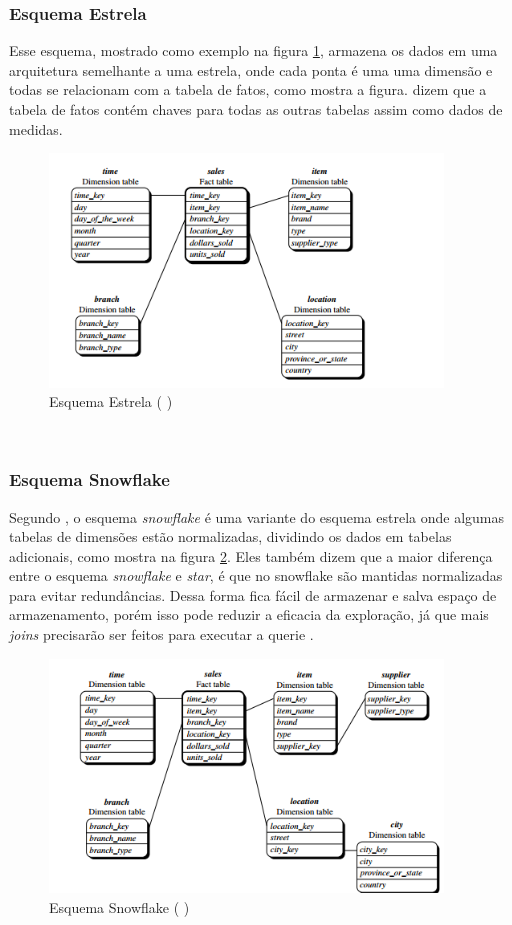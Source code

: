\subsubsection{Esquema Estrela}
Esse esquema, mostrado como exemplo na figura \ref{star}, armazena os dados em uma arquitetura semelhante a uma estrela, onde cada ponta é uma uma dimensão e todas se relacionam com a tabela de fatos, como mostra a figura.  dizem que a tabela de fatos contém chaves para todas as outras tabelas assim como dados de medidas.
\begin{figure}[ht]
\centering
\includegraphics[height=6.2cm]{imagens/starscheme.png}
\caption{Esquema Estrela (\citeauthor{jmj} \citeyear{jmj})}
\label{star}
\end{figure}
\\
\subsubsection{Esquema Snowflake}
Segundo , o esquema \textit{snowflake} é uma variante do esquema estrela onde algumas tabelas de dimensões estão normalizadas, dividindo os dados em tabelas adicionais, como mostra na figura \ref{snowflake}. Eles também dizem que a maior diferença entre o esquema \textit{snowflake} e \textit{star}, é que no snowflake são mantidas normalizadas para evitar redundâncias. Dessa forma fica fácil de armazenar e salva espaço de armazenamento, porém isso pode reduzir a eficacia da exploração, já que mais \textit{joins} precisarão ser feitos para executar a querie \citep{jmj}.
\begin{figure}[ht]
\centering
\includegraphics[height=6.2cm]{imagens/snowflakescheme.png}
\caption{Esquema Snowflake (\citeauthor{jmj} \citeyear{jmj})}
\label{snowflake}
\end{figure}

